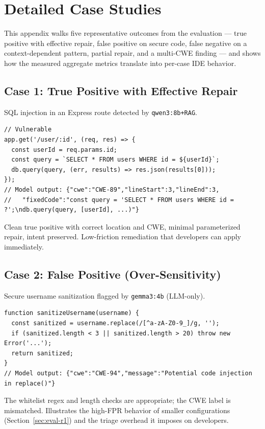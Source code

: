 \chapter{Detailed Case Studies}
\label{appendix:case-studies}

This appendix walks five representative outcomes from the evaluation --- true positive with effective repair, false positive on secure code, false negative on a context-dependent pattern, partial repair, and a multi-CWE finding --- and shows how the measured aggregate metrics translate into per-case IDE behavior.

\section{Case 1: True Positive with Effective Repair}
\label{sec:case-tp-good}
SQL injection in an Express route detected by \texttt{qwen3:8b+RAG}.
\begin{lstlisting}[caption={SQL injection vulnerability (CWE-89) and the model's repair}]
// Vulnerable
app.get('/user/:id', (req, res) => {
  const userId = req.params.id;
  const query = `SELECT * FROM users WHERE id = ${userId}`;
  db.query(query, (err, results) => res.json(results[0]));
});
// Model output: {"cwe":"CWE-89","lineStart":3,"lineEnd":3,
//   "fixedCode":"const query = 'SELECT * FROM users WHERE id = ?';\ndb.query(query, [userId], ...)"}
\end{lstlisting}
Clean true positive with correct location and CWE, minimal parameterized repair, intent preserved. Low-friction remediation that developers can apply immediately.

\section{Case 2: False Positive (Over-Sensitivity)}
\label{sec:case-fp}
Secure username sanitization flagged by \texttt{gemma3:4b} (LLM-only).
\begin{lstlisting}[caption={Secure input validation flagged as CWE-94}]
function sanitizeUsername(username) {
  const sanitized = username.replace(/[^a-zA-Z0-9_]/g, '');
  if (sanitized.length < 3 || sanitized.length > 20) throw new Error('...');
  return sanitized;
}
// Model output: {"cwe":"CWE-94","message":"Potential code injection in replace()"}
\end{lstlisting}
The whitelist regex and length checks are appropriate; the CWE label is mismatched. Illustrates the high-FPR behavior of smaller configurations (Section~\ref{sec:eval-r1}) and the triage overhead it imposes on developers.

